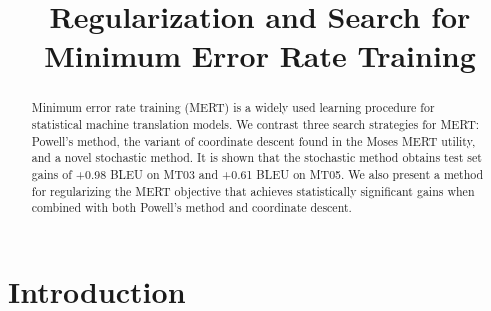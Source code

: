 \documentclass[11pt]{article}
\title{Regularization and Search for Minimum Error Rate Training}
\author{}
\date{}
\begin{document}
\maketitle
\begin{abstract}
Minimum error rate training (MERT) is a widely used learning procedure for statistical machine translation models. We contrast three search strategies for MERT: Powell's method, the variant of coordinate descent found in the Moses MERT utility, and a novel stochastic method. It is shown that the stochastic method obtains test set gains of +0.98 BLEU on MT03 and +0.61 BLEU on MT05. We also present a method for regularizing the MERT objective that achieves statistically significant gains when combined with both Powell's method and coordinate descent.
 
\end{abstract}

\section{Introduction}
\end{document}
